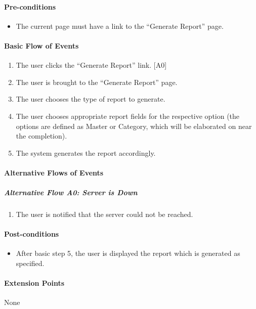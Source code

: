 \documentclass{article}
\begin{document}
\paragraph{Pre-conditions}
\begin{itemize}
\item The current page must have a link to the ``Generate Report'' page.
\end{itemize}

\paragraph{Basic Flow of Events}
\begin{enumerate}
\item The user clicks the ``Generate Report'' link. [A0]
\item The user is brought to the ``Generate Report'' page.
\item The user chooses the type of report to generate.
\item The user chooses appropriate report fields for the respective option (the options are defined as Master or Category, which will be elaborated on near the completion).
\item The system generates the report accordingly.
\end{enumerate}

\paragraph{Alternative Flows of Events}

\subparagraph{Alternative Flow A0: Server is Down}
\begin{enumerate}
\item The user is notified that the server could not be reached.
\end{enumerate}

\paragraph{Post-conditions}
\begin{itemize}
\item After basic step 5, the user is displayed the report which is generated as specified.
\end{itemize}

\paragraph{Extension Points}
None
\end{document}

